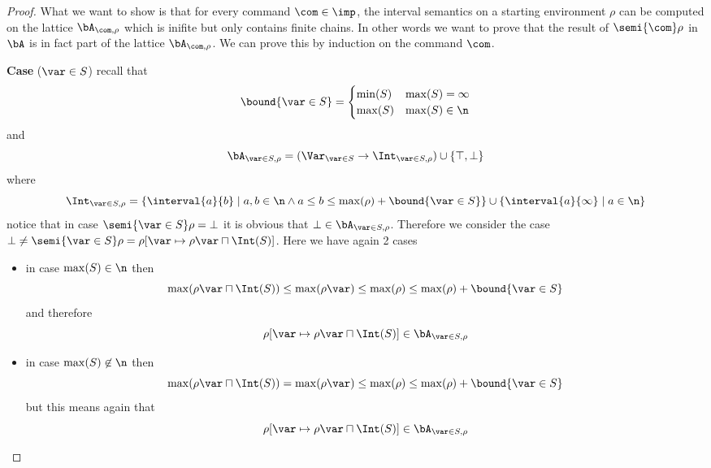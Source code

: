 \begin{proof}
  What we want to show is that for every command \(\com\in\imp\), the
  interval semantics on a starting environment \(\rho\) can be
  computed on the lattice \(\bA_{\com,\rho}\) which is inifite but
  only contains finite chains. In other words we want to prove that
  the result of \(\semi{\com}\rho\) in \(\bA\) is in fact part of the
  lattice \(\bA_{\com,\rho}\). We can prove this by induction on the
  command \(\com\).

  \noindent
  \textbf{Case} (\(\var \in S\)) 
  recall that
  \begin{equation*}
    \bound{\var\in S} = \begin{cases}
      \min(S) & \max(S) = \infty \\
      \max(S) & \max(S) \in \n
    \end{cases}
  \end{equation*}
  and
  \begin{equation*}
    \bA_{\var\in S, \rho} = (\Var_{\var\in S} \to \Int_{\var\in S, \rho} ) \cup \{\top, \bot\}
  \end{equation*}
  where
  \begin{equation*}
    \Int_{\var\in S, \rho} = \{\interval{a}{b} \mid a,b \in \n \wedge a \leq b \leq \max(\rho) + \bound{\var\in S}\} \cup \{\interval{a}{\infty} \mid a \in \n\}
  \end{equation*}
  notice that in case \(\semi{\var\in S}\rho = \bot\) it is obvious
  that \(\bot \in \bA_{\var \in S,\rho}\). Therefore we consider the case
  \(\bot \neq \semi{\var\in S}\rho = \rho[\var \mapsto \rho\var \sqcap
  \Int(S)]\). Here we have again 2 cases
  \begin{itemize}
  \item in case \(\max(S) \in \n\) then
    \begin{equation*}
      \max(\rho\var \sqcap \Int(S)) \leq \max(\rho \var) \leq \max(\rho) \leq \max(\rho) + \bound{\var\in S}
    \end{equation*}
    and therefore
    \begin{equation*}
      \rho[\var \mapsto \rho\var \sqcap \Int(S)] \in \bA_{\var \in S, \rho}
    \end{equation*}
    
  \item in case \(\max(S)\not\in \n\) then
    \begin{equation*}
      \max(\rho\var \sqcap \Int(S)) = \max(\rho\var) \leq \max(\rho) \leq \max(\rho) + \bound{\var \in S}
    \end{equation*}
    but this means again that
    \begin{equation*}
      \rho[\var \mapsto \rho\var \sqcap \Int(S)] \in \bA_{\var \in S,\rho}
    \end{equation*}
  \end{itemize}


\end{proof}
